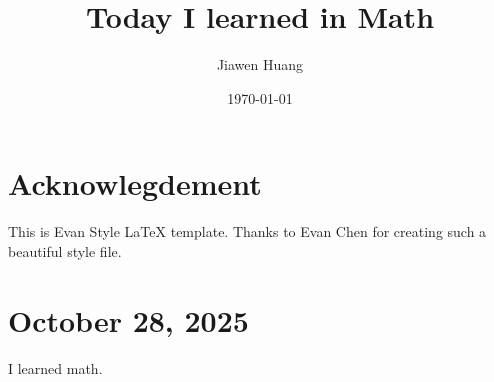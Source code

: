 \documentclass[15pt]{scrartcl}
\begin{document}
\title{Today I learned in Math}
\date{\today}
\author{Jiawen Huang}
\maketitle
\section*{Acknowlegdement}
This is Evan Style LaTeX template. Thanks to Evan Chen for creating such a beautiful style file.
\section*{October 28, 2025}

I learned math. 
\end{document}
